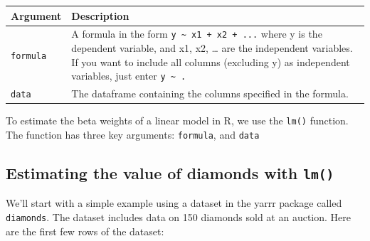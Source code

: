 \documentclass[]{book}
\theoremstyle{definition}
\theoremstyle{definition}
\theoremstyle{remark}
\begin{document}
\begin{longtable}[]{@{}ll@{}}
\toprule
\begin{minipage}[b]{0.18\columnwidth}\raggedright\strut
Argument\strut
\end{minipage} & \begin{minipage}[b]{0.67\columnwidth}\raggedright\strut
Description\strut
\end{minipage}\tabularnewline
\midrule
\endhead
\begin{minipage}[t]{0.18\columnwidth}\raggedright\strut
\texttt{formula}\strut
\end{minipage} & \begin{minipage}[t]{0.67\columnwidth}\raggedright\strut
A formula in the form \texttt{y\ \textasciitilde{}\ x1\ +\ x2\ +\ ...}
where y is the dependent variable, and x1, x2, \ldots{} are the
independent variables. If you want to include all columns (excluding y)
as independent variables, just enter
\texttt{y\ \textasciitilde{}\ .}\strut
\end{minipage}\tabularnewline
\begin{minipage}[t]{0.18\columnwidth}\raggedright\strut
\texttt{data}\strut
\end{minipage} & \begin{minipage}[t]{0.67\columnwidth}\raggedright\strut
The dataframe containing the columns specified in the formula.\strut
\end{minipage}\tabularnewline
\bottomrule
\end{longtable}

To estimate the beta weights of a linear model in R, we use the
\texttt{lm()} function. The function has three key arguments:
\texttt{formula}, and \texttt{data}

\subsection{\texorpdfstring{Estimating the value of diamonds with
\texttt{lm()}}{Estimating the value of diamonds with lm()}}\label{estimating-the-value-of-diamonds-with-lm}

We'll start with a simple example using a dataset in the yarrr package
called \texttt{diamonds}. The dataset includes data on 150 diamonds sold
at an auction. Here are the first few rows of the dataset:
\end{document}
